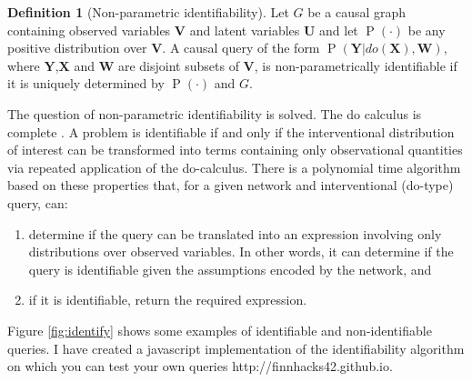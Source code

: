 \documentclass[11pt,a4paper,twoside]{report}
\renewcommand{\P}[1]{\operatorname{P}\left(#1\right)}
\theoremstyle{plain}
\theoremstyle{definition}
\newtheorem{definition}[theorem]{Definition}
\begin{document}
\vspace*{.3cm}
\begin{definition}[Non-parametric identifiability]
Let $G$ be a causal graph containing observed variables $\boldsymbol{V}$ and latent variables $\boldsymbol{U}$ and let $\P{\cdot}$ be any positive distribution over $\boldsymbol{V}$. A causal query of the form $\P{\boldsymbol{Y}|do(\boldsymbol{X}),\boldsymbol{W}}$, where $\boldsymbol{Y}$,$\boldsymbol{X}$ and $\boldsymbol{W}$ are disjoint subsets of $\boldsymbol{V}$, is non-parametrically identifiable if it is uniquely determined by $\P{\cdot}$ and $G$.
\end{definition} 

The question of non-parametric identifiability is solved. The do calculus is complete \citep{Shpitser2006b,Huang2006}. A problem is identifiable if and only if the interventional distribution of interest can be transformed into terms containing only observational quantities via repeated application of the do-calculus. There is a polynomial time algorithm \citep{Shpitser2006a} based on these properties that, for a given network and interventional (do-type) query, can:

\begin{enumerate}
\item determine if the query can be translated into an expression involving only distributions over observed variables. In other words, it can determine if the query is identifiable given the assumptions encoded by the network, and
\item if it is identifiable, return the required expression. 
\end{enumerate}

Figure \ref{fig:identify} shows some examples of identifiable and non-identifiable queries. I have created a javascript implementation of the identifiability algorithm \citep{Shpitser2006a} on which you can test your own queries http://finnhacks42.github.io.
\end{document}
